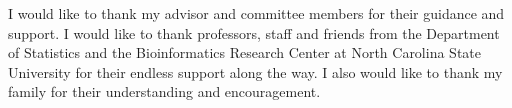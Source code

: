 \begin{acknowledgements}
I would like to thank my advisor and committee members for their guidance and support. I would like to thank professors, staff and friends from the Department of Statistics and the Bioinformatics Research Center at North Carolina State University for their endless support along the way. I also would like to thank my family for their understanding and encouragement.
\end{acknowledgements}


\thesistableofcontents

\thesislistoftables

\thesislistoffigures
   